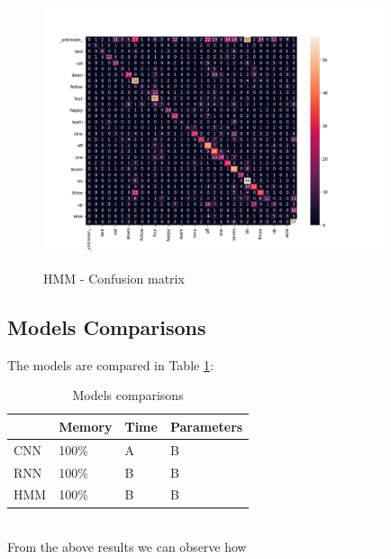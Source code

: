 \begin{figure}[h]
			\centering
	    	\includegraphics[width=10cm, height=8cm]{conf_matrix_cnn_dii_cm}
	    	\caption{HMM - Confusion matrix}
	    	\label{fig:conf_matrix_}
\end{figure} 


\subsection*{\textbf{Models Comparisons}}
The models are compared in Table \ref{table:comparisons}:\\
\begin{table}[h!]
\centering
\begin{tabular}{ p{1.5cm}|p{1.5cm}|p{1.5cm}|p{1.5cm} }
 \hline
  & Memory & Time & Parameters \\
\hline\hline
CNN & 100\% & A & B \\
\hline
RNN & 100\% & B  & B\\
\hline
HMM &100\% & B  & B\\
\hline
\end{tabular}
\caption{Models comparisons}
\label{table:comparisons}
\end{table}\\
\noindent From the above results we can observe how {}